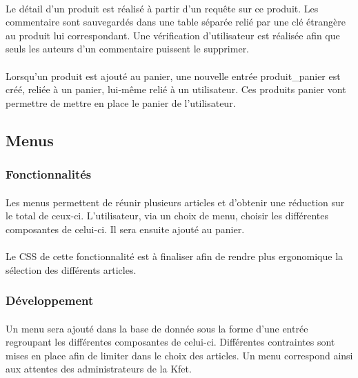 \documentclass[twoside,UTF8]{EPURapport}
\begin{document}
                \paragraph{}Le détail d'un produit est réalisé à partir d'un requête sur ce produit. Les commentaire sont sauvegardés dans une table séparée relié par une clé étrangère au produit lui correspondant. Une vérification d'utilisateur est réalisée afin que seuls les auteurs d'un commentaire puissent le supprimer.

                \paragraph{}Lorsqu'un produit est ajouté au panier, une nouvelle entrée produit\_panier est créé, reliée à un panier, lui-même relié à un utilisateur. Ces produits panier vont permettre de mettre en place le panier de l'utilisateur.

        \subsection{Menus}

            \subsubsection{Fonctionnalités}

                \paragraph{}Les menus permettent de réunir plusieurs articles et d'obtenir une réduction sur le total de ceux-ci. L'utilisateur, via un choix de menu, choisir les différentes composantes de celui-ci. Il sera ensuite ajouté au panier.

                \paragraph{}Le CSS de cette fonctionnalité est à finaliser afin de rendre plus ergonomique la sélection des différents articles.

            \subsubsection{Développement}
                
                \paragraph{}Un menu sera ajouté dans la base de donnée sous la forme d'une entrée regroupant les différentes composantes de celui-ci. Différentes contraintes sont mises en place afin de limiter dans le choix des articles. Un menu correspond ainsi aux attentes des administrateurs de la Kfet.
\end{document}
